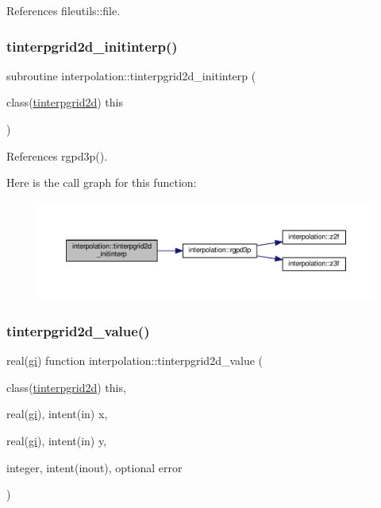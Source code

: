 References fileutils\+::file.

\mbox{\label{namespaceinterpolation_a7bde4bd21a717432ca0927ec3f2393ee}} 
\subsubsection{\texorpdfstring{tinterpgrid2d\+\_\+initinterp()}{tinterpgrid2d\_initinterp()}}
{\footnotesize\ttfamily subroutine interpolation\+::tinterpgrid2d\+\_\+initinterp (\begin{DoxyParamCaption}\item[{class(\mbox{\hyperlink{structinterpolation_1_1tinterpgrid2d}{tinterpgrid2d}})}]{this }\end{DoxyParamCaption})}



References rgpd3p().

Here is the call graph for this function\+:
\nopagebreak
\begin{figure}[H]
\begin{center}
\leavevmode
\includegraphics[width=350pt]{namespaceinterpolation_a7bde4bd21a717432ca0927ec3f2393ee_cgraph}
\end{center}
\end{figure}
\mbox{\label{namespaceinterpolation_a77feb149313f842af954a528b8bff58e}} 
\subsubsection{\texorpdfstring{tinterpgrid2d\+\_\+value()}{tinterpgrid2d\_value()}}
{\footnotesize\ttfamily real(\mbox{\hyperlink{namespaceinterpolation_a7242dea48715e8170bae81efe12c64be}{gi}}) function interpolation\+::tinterpgrid2d\+\_\+value (\begin{DoxyParamCaption}\item[{class(\mbox{\hyperlink{structinterpolation_1_1tinterpgrid2d}{tinterpgrid2d}})}]{this,  }\item[{real(\mbox{\hyperlink{namespaceinterpolation_a7242dea48715e8170bae81efe12c64be}{gi}}), intent(in)}]{x,  }\item[{real(\mbox{\hyperlink{namespaceinterpolation_a7242dea48715e8170bae81efe12c64be}{gi}}), intent(in)}]{y,  }\item[{integer, intent(inout), optional}]{error }\end{DoxyParamCaption})}



